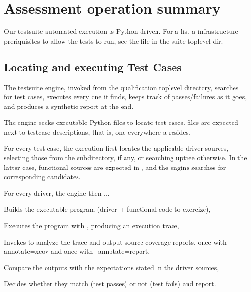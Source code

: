 \documentclass {report}
\begin{document}
\section{Assessment operation summary}
\label{sec:assessment}

Our testsuite automated execution is Python driven.
%
For a list a infrastructure preriquisites to allow the tests to run, see the
 file in the suite toplevel dir.

\subsection{Locating and executing Test Cases}

The testsuite engine, invoked from the qualification toplevel directory,
searches for test cases, executes every one it finds, keeps track of
passes/failures as it goes, and produces a synthetic report at the end.

The engine seeks executable  Python files to locate test cases.
%
 files are expected next to testcase descriptions,
that is, one everywhere a  resides.

For every test case, the execution first locates the applicable driver
sources, selecting those from the  subdirectory, if any, or searching
uptree otherwise.
%
In the latter case, functional sources are expected in , and
the engine searches for corresponding  candidates.

For every  driver, the engine then ...

\begin{Itemize}  
\item%
  Builds the executable program (driver + functional code to exercize),

\item%
  Executes the program with , producing an execution trace,

\item%
  Invokes  to analyze the trace and output source coverage
  reports, once with --annotate=xcov and once with --annotate=report,

\item%
  Compare the outputs with the expectations stated in the driver sources,

\item%
  Decides whether they match (test passes) or not (test fails) and report.
\end{Itemize}  
\end{document}
